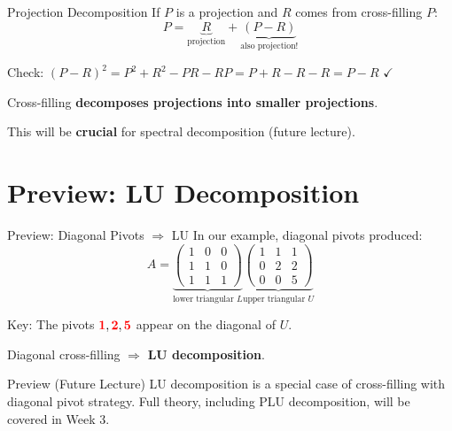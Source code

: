 \documentclass[10pt]{beamer}
\theoremstyle{definition}
\newcommand{\pvt}[1]{{\color{red}\mathbf{#1}}}       %
\newcommand{\x}[1]{\alert{\textbf{#1}}}
\begin{document}
\begin{frame}{Projection Decomposition}
If $P$ is a projection and $R$ comes from cross-filling $P$:
$$P = \underbrace{R}_{\text{projection}} + \underbrace{(P-R)}_{\text{also projection!}}$$

\vspace{0.3cm}
Check: $(P-R)^2 = P^2 + R^2 - PR - RP = P + R - R - R = P - R$ \quad $\checkmark$

\vspace{0.3cm}
Cross-filling \x{decomposes projections into smaller projections}.

This will be \x{crucial} for spectral decomposition (future lecture).
\end{frame}

\section{Preview: LU Decomposition}

\begin{frame}{Preview: Diagonal Pivots $\Rightarrow$ LU}
In our example, diagonal pivots produced:
$$A = \underbrace{\begin{pmatrix}
1 & 0 & 0 \\
1 & 1 & 0 \\
1 & 1 & 1
\end{pmatrix}}_{\text{lower triangular } L}
\underbrace{\begin{pmatrix}
1 & 1 & 1 \\
0 & 2 & 2 \\
0 & 0 & 5
\end{pmatrix}}_{\text{upper triangular } U}$$

\vfill
Key: The pivots $\pvt{1}, \pvt{2}, \pvt{5}$ appear on the diagonal of $U$.

\vfill
Diagonal cross-filling $\Longrightarrow$ \x{LU decomposition}.

\vfill
\begin{alertblock}{Preview (Future Lecture)}
LU decomposition is a special case of cross-filling with diagonal pivot strategy.
Full theory, including PLU decomposition, will be covered in Week 3.
\end{alertblock}
\end{frame}
\end{document}
